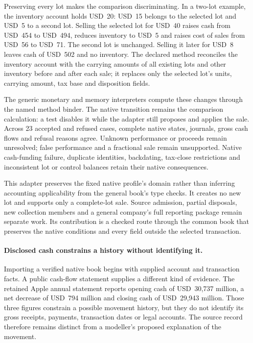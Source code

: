 Preserving every lot makes the comparison discriminating. In a two-lot example,
the inventory account holds USD~20: USD~15 belongs to the selected lot and USD~5
to a second lot. Selling the selected lot for USD~40 raises cash from USD~454
to USD~494, reduces inventory to USD~5 and raises cost of sales from USD~56 to
USD~71. The second lot is unchanged. Selling it later for USD~8 leaves cash of
USD~502 and no inventory. The declared method reconciles the inventory account
with the carrying amounts of all existing lots and other inventory before and
after each sale; it replaces only the selected lot's units, carrying amount,
tax base and disposition fields.

The generic monetary and memory interpreters compute these changes through the
named method binder. The native transition remains the comparison calculation:
a test disables it while the adapter still proposes and applies the sale. Across
23 accepted and refused cases, complete native states, journals, gross cash flows
and refusal reasons agree. Unknown performance or proceeds remain unresolved;
false performance and a fractional sale remain unsupported. Native cash-funding
failure, duplicate identities, backdating, tax-close restrictions and inconsistent
lot or control balances retain their native consequences.

This adapter preserves the fixed native profile's domain rather than inferring
accounting applicability from the general book's type checks. It creates no new
lot and supports only a complete-lot sale. Source admission, partial disposals,
new collection members and a general company's full reporting package remain
separate work. Its contribution is a checked route through the common book that
preserves the native conditions and every field outside the selected transaction.

\paragraph{Disclosed cash constrains a history without identifying it.}
Importing a verified native book begins with supplied account and transaction
facts. A public cash-flow statement supplies a different kind of evidence.
The retained Apple annual statement reports opening cash of USD~30,737 million,
a net decrease of USD~794 million and closing cash of USD~29,943 million.
Those three figures constrain a possible movement history, but they do not
identify its gross receipts, payments, transaction dates or legal accounts.
The source record therefore remains distinct from a modeller's proposed
explanation of the movement.

